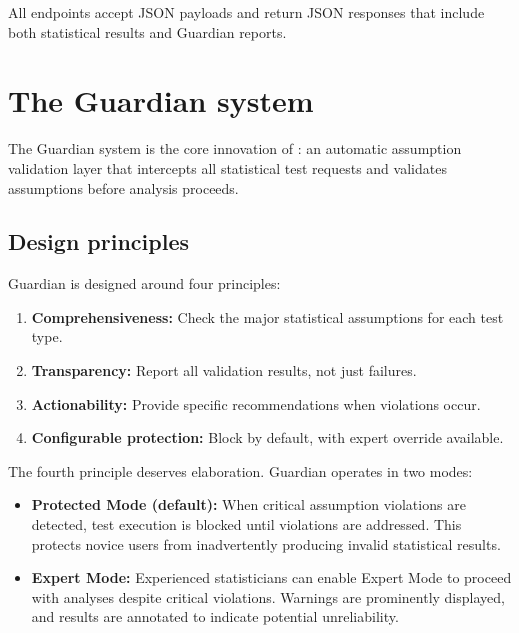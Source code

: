 \documentclass[article]{jss}
\begin{document}
All endpoints accept JSON payloads and return JSON responses that include both statistical results and Guardian reports.


\section{The Guardian system} \label{sec:guardian}

The Guardian system is the core innovation of : an automatic assumption validation layer that intercepts all statistical test requests and validates assumptions before analysis proceeds.

\subsection{Design principles}

Guardian is designed around four principles:

\begin{enumerate}
\item \textbf{Comprehensiveness:} Check the major statistical assumptions for each test type.
\item \textbf{Transparency:} Report all validation results, not just failures.
\item \textbf{Actionability:} Provide specific recommendations when violations occur.
\item \textbf{Configurable protection:} Block by default, with expert override available.
\end{enumerate}

The fourth principle deserves elaboration. Guardian operates in two modes:

\begin{itemize}
\item \textbf{Protected Mode (default):} When critical assumption violations are detected, test execution is blocked until violations are addressed. This protects novice users from inadvertently producing invalid statistical results.
\item \textbf{Expert Mode:} Experienced statisticians can enable Expert Mode to proceed with analyses despite critical violations. Warnings are prominently displayed, and results are annotated to indicate potential unreliability.
\end{itemize}
\end{document}
